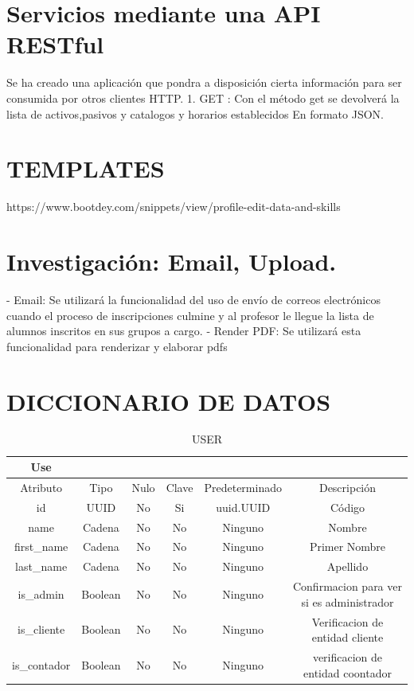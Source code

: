 \documentclass{article}
\begin{document}
\section{Servicios mediante una API RESTful}
Se ha creado una aplicación que pondra a disposición cierta información para ser consumida por otros clientes HTTP.
1. GET : Con el método get se devolverá la lista de activos,pasivos y catalogos y horarios establecidos En formato JSON.

\section{TEMPLATES}

https://www.bootdey.com/snippets/view/profile-edit-data-and-skills

\section{Investigación: Email, Upload.}
- Email: Se utilizará la funcionalidad del uso de envío de correos electrónicos cuando el proceso de inscripciones culmine y al profesor le llegue la lista de alumnos inscritos en sus grupos a cargo.
- Render PDF: Se utilizará esta funcionalidad para renderizar y elaborar pdfs 

\section{DICCIONARIO DE DATOS}

\begin{table}[H]
    \centering
    \begin{tabular}{|c|c|c|c|c|c|}
    \hline
Use	& & & & & \\		
\hline
Atributo &	Tipo &	Nulo &	Clave &	Predeterminado &	Descripción \\
\hline
id &	UUID	& No &	Si	& uuid.UUID &	Código\\
\hline
name	&Cadena	&No	&No&	Ninguno	&Nombre \\
\hline
first_name&	Cadena&	No&	No	&Ninguno&	Primer Nombre \\
\hline
last_name&	Cadena&	No&	No&	Ninguno&	Apellido\\
\hline
is_admin&	Boolean&	No&	No	&Ninguno&	Confirmacion para ver si es administrador \\
\hline
is_cliente&	Boolean	&No	&No&	Ninguno	&Verificacion de entidad cliente \\
\hline
is_contador&	Boolean&	No&	No	&Ninguno	&verificacion de entidad coontador \\
\hline
    \end{tabular}
    \caption{USER}
    \label{}
\end{table}
\end{document}
